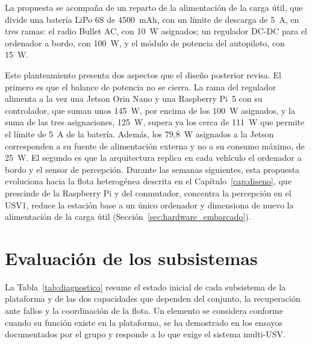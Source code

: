\FloatBarrier

La propuesta se acompaña de un reparto de la alimentación de la carga útil, que divide una batería LiPo 6S de 4500~mAh, con un límite de descarga de 5~A, en tres ramas: el radio Bullet AC, con 10~W asignados; un regulador DC-DC para el ordenador a bordo, con 100~W, y el módulo de potencia del autopiloto, con 15~W.

Este planteamiento presenta dos aspectos que el diseño posterior revisa. El primero es que el balance de potencia no se cierra. La rama del regulador alimenta a la vez una Jetson Orin Nano y una Raspberry Pi~5 con su controlador, que suman unos 145~W, por encima de los 100~W asignados, y la suma de las tres asignaciones, 125~W, supera ya los cerca de 111~W que permite el límite de 5~A de la batería. Además, los 79,8~W asignados a la Jetson corresponden a su fuente de alimentación externa y no a su consumo máximo, de 25~W. El segundo es que la arquitectura replica en cada vehículo el ordenador a bordo y el sensor de percepción. Durante las semanas siguientes, esta propuesta evoluciona hacia la flota heterogénea descrita en el Capítulo~\ref{cap:diseno}, que prescinde de la Raspberry Pi y del conmutador, concentra la percepción en el USV1, reduce la estación base a un único ordenador y dimensiona de nuevo la alimentación de la carga útil (Sección~\ref{sec:hardware_embarcado}). %

\section{Evaluación de los subsistemas}
\label{sec:evaluacion_subsistemas}

La Tabla~\ref{tab:diagnostico} resume el estado inicial de cada subsistema de la plataforma y de las dos capacidades que dependen del conjunto, la recuperación ante fallos y la coordinación de la flota. Un elemento se considera conforme cuando su función existe en la plataforma, se ha demostrado en los ensayos documentados por el grupo y responde a lo que exige el sistema multi-USV.

